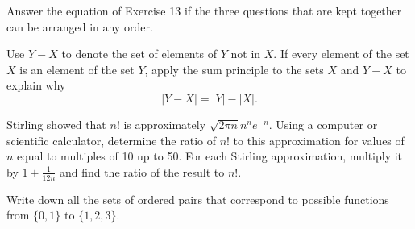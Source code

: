 \documentclass[12pt,letterpaper,boxed]{amspset}
\begin{document}
\begin{solution}

\end{solution}



\begin{problem}[1.1.14]
Answer the equation of Exercise 13 if the three questions that are
kept together can be arranged in any order.
\end{problem}

\begin{solution}

\end{solution}



\begin{problem}[1.1.16]
Use $Y - X$ to denote the set of elements of $Y$ not in $X$. If every
element of the set $X$ is an element of the set $Y$, apply the sum
principle to the sets $X$ and $Y - X$ to explain why
\[
       | Y - X| = |Y| - |X|.
\]
\end{problem}

\begin{solution}

\end{solution}



\begin{problem}[1.1.18]
Stirling showed that $n!$ is approximately $\sqrt{2 \pi n} n^{n}
e^{-n}$. Using a computer or scientific calculator, determine the ratio
of $n!$ to this approximation for values of $n$ equal to multiples of
10 up to 50. For each Stirling approximation, multiply it by $1 + 
\frac{1}{12n}$ and find the ratio of the result to $n!$.
\end{problem}

\begin{solution}

\end{solution}



\begin{problem}[1.2.1]
Write down all the sets of ordered pairs that correspond to possible
functions from $\{ 0, 1 \}$ to $\{1, 2, 3 \}$.
\end{problem}

\begin{solution}

\end{solution}

\end{document}
